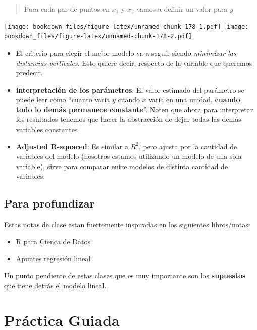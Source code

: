 \documentclass[]{book}
\providecommand{\tightlist}{%
  \setlength{\itemsep}{0pt}\setlength{\parskip}{0pt}}
\begin{document}
\begin{quote}
Para cada par de puntos en \(x_1\) y \(x_2\) vamos a definir un valor para \(y\)
\end{quote}

\texttt{[image: bookdown\_files/figure-latex/unnamed-chunk-178-1.pdf]} \texttt{[image: bookdown\_files/figure-latex/unnamed-chunk-178-2.pdf]}

\begin{itemize}
\item
  El criterio para elegir el mejor modelo va a seguir siendo \emph{minimizar las distancias verticales}. Esto quiere decir, respecto de la variable que queremos predecir.
\item
  \textbf{interpretación de los parámetros}: El valor estimado del parámetro se puede leer como ``cuanto varía \(y\) cuando \(x\) varía en una unidad, \textbf{cuando todo lo demás permanece constante}''. Noten que ahora para interpretar los resultados tenemos que hacer la abstracción de dejar todas las demás variables constantes
\item
  \textbf{Adjusted R-squared}: Es similar a \(R^2\), pero ajusta por la cantidad de variables del modelo (nosotros estamos utilizando un modelo de una sola variable), sirve para comparar entre modelos de distinta cantidad de variables.
\end{itemize}

\hypertarget{para-profundizar}{%
\subsection{Para profundizar}\label{para-profundizar}}

Estas notas de clase estan fuertemente inspiradas en los siguientes libros/notas:

\begin{itemize}
\tightlist
\item
  \href{https://es.r4ds.hadley.nz/}{R para Cienca de Datos}
\item
  \href{http://mate.dm.uba.ar/~meszre/apunte_regresion_lineal_szretter.pdf}{Apuntes regresión lineal}
\end{itemize}

Un punto pendiente de estas clases que es muy importante son los \textbf{supuestos} que tiene detrás el modelo lineal.

\hypertarget{practica-guiada-6}{%
\section{Práctica Guiada}\label{practica-guiada-6}}
\end{document}
